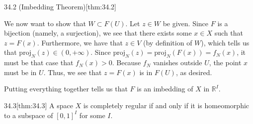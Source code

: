 \begin{thmBox}{34.2 (Imbedding Theorem)}[thm:34.2]
\begin{proofBox}
        \baseSkip
    
        We now want to show that \( W \subset F ( U ) \).
        Let \( z \in W \) be given.
        Since \( F \) is a bijection (namely, a surjection), we see that there exists 
        some \( x \in X \) such that \( z = F ( x ) \).
        Furthermore, we have that \( z \in V \) (by definition of \( W \)), which tells 
        us that \( \mathrm{proj}_{ N } ( z ) \in ( 0, + \infty ) \).
        Since 
        \( 
            \mathrm{proj}_{ N } ( z ) = \mathrm{proj}_{ N } ( F ( x ) ) = f_{ N } ( x ) 
        \),
        it must be that case that \( f_{ N } ( x ) > 0 \).
        Because \( f_{ N } \) vanishes outside \( U \), the point \( x \) must be in 
        \( U \).
        Thus, we see that \( z = F ( x ) \) is in \( F ( U ) \), as desired.
    
        \baseSkip

        Putting everything together tells us that \( F \) is an imbedding of \( X \) in
        \( \mathbb{R}^{ I } \).
    \end{proofBox}
\end{thmBox}

\begin{thmBox}{34.3}[thm:34.3]
    A space \( X \) is completely regular if and only if it is homeomorphic to a 
    subspace of \( [ 0, 1 ]^{ I } \) for some \( I \).

    \baseRule

    \begin{proofBox}

    \end{proofBox}
\end{thmBox}

